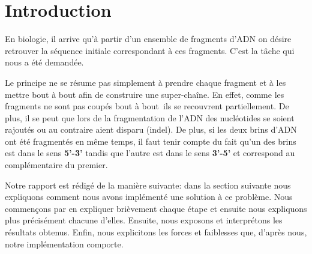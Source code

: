 
\section{Introduction}

En biologie, il arrive qu'à partir d'un ensemble de fragments d'ADN on désire retrouver la séquence initiale correspondant à ces fragments.
C'est la tâche qui nous a été demandée. 

Le principe ne se résume pas simplement à prendre chaque fragment et à les mettre bout à bout afin de construire une super-chaîne. En effet,
comme les fragments ne sont pas coupés \og bout à bout\fg~ils se recouvrent partiellement. De plus, il se peut que lors de la fragmentation de l'ADN des nucléotides se soient rajoutés ou au contraire aient disparu (indel). De plus, si les deux brins d'ADN ont été fragmentés en même temps, il faut tenir compte du fait qu'un des brins est dans le sens \textbf{5'-3'} tandis que l'autre est dans le sens \textbf{3'-5'} et correspond au complémentaire du premier.

Notre rapport est rédigé de la manière suivante: dans la section suivante nous expliquons comment nous avons implémenté une solution à ce problème. Nous commençons par en expliquer brièvement chaque étape et ensuite nous expliquons plus précisément chacune d'elles. Ensuite, nous exposons et interprétons les résultats obtenus. Enfin, nous explicitons les forces et faiblesses que, d'après nous, notre implémentation comporte.
